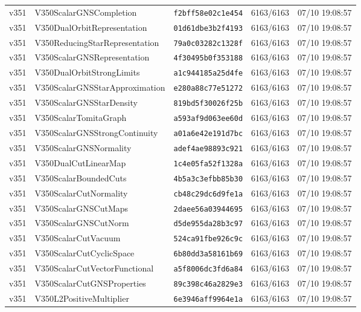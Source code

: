 \documentclass[11pt]{article}
\theoremstyle{definition}\newtheorem{deriv}{Derivation}
\begin{document}
{\begin{longtable}{@{}lllll@{}}
v351 & V350ScalarGNSCompletion & \texttt{f2bff58e02c1e454} & 6163/6163 & 07/10 19:08:57 \\
v351 & V350DualOrbitRepresentation & \texttt{01d61dbe3b2f4193} & 6163/6163 & 07/10 19:08:57 \\
v351 & V350ReducingStarRepresentation & \texttt{79a0c03282c1328f} & 6163/6163 & 07/10 19:08:57 \\
v351 & V350ScalarGNSRepresentation & \texttt{4f30495b0f353188} & 6163/6163 & 07/10 19:08:57 \\
v351 & V350DualOrbitStrongLimits & \texttt{a1c944185a25d4fe} & 6163/6163 & 07/10 19:08:57 \\
v351 & V350ScalarGNSStarApproximation & \texttt{e280a88c77e51272} & 6163/6163 & 07/10 19:08:57 \\
v351 & V350ScalarGNSStarDensity & \texttt{819bd5f30026f25b} & 6163/6163 & 07/10 19:08:57 \\
v351 & V350ScalarTomitaGraph & \texttt{a593af9d063ee60d} & 6163/6163 & 07/10 19:08:57 \\
v351 & V350ScalarGNSStrongContinuity & \texttt{a01a6e42e191d7bc} & 6163/6163 & 07/10 19:08:57 \\
v351 & V350ScalarGNSNormality & \texttt{adef4ae98893c921} & 6163/6163 & 07/10 19:08:57 \\
v351 & V350DualCutLinearMap & \texttt{1c4e05fa52f1328a} & 6163/6163 & 07/10 19:08:57 \\
v351 & V350ScalarBoundedCuts & \texttt{4b5a3c3efbb85b30} & 6163/6163 & 07/10 19:08:57 \\
v351 & V350ScalarCutNormality & \texttt{cb48c29dc6d9fe1a} & 6163/6163 & 07/10 19:08:57 \\
v351 & V350ScalarGNSCutMaps & \texttt{2daee56a03944695} & 6163/6163 & 07/10 19:08:57 \\
v351 & V350ScalarGNSCutNorm & \texttt{d5de955da28b3c97} & 6163/6163 & 07/10 19:08:57 \\
v351 & V350ScalarCutVacuum & \texttt{524ca91fbe926c9c} & 6163/6163 & 07/10 19:08:57 \\
v351 & V350ScalarCutCyclicSpace & \texttt{6b80dd3a58161b69} & 6163/6163 & 07/10 19:08:57 \\
v351 & V350ScalarCutVectorFunctional & \texttt{a5f8006dc3fd6a84} & 6163/6163 & 07/10 19:08:57 \\
v351 & V350ScalarCutGNSProperties & \texttt{89c398c46a2829e3} & 6163/6163 & 07/10 19:08:57 \\
v351 & V350L2PositiveMultiplier & \texttt{6e3946aff9964e1a} & 6163/6163 & 07/10 19:08:57 \\

\end{longtable}}
\end{document}

